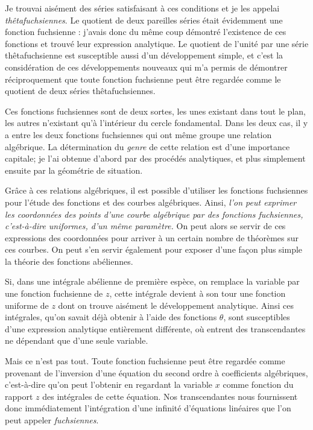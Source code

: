 \documentclass[11pt]{article}
\begin{document}
Je trouvai aisément des séries satisfaisant à ces conditions et je les appelai \emph{thêtafuchsiennes}. Le quotient de deux pareilles séries était évidemment une fonction fuchsienne : j’avais donc du même coup démontré l’existence de ces fonctions et trouvé leur expression analytique. Le quotient de l’unité par une série thêtafuchsienne est susceptible aussi d’un développement simple, et c’est la considération de ces développements nouveaux qui m’a permis de démontrer réciproquement que toute fonction fuchsienne peut être regardée comme le quotient de deux séries thêtafuchsiennes.

Ces fonctions fuchsiennes sont de deux sortes, les unes existant dans tout le plan, les autres n’existant qu’à l’intérieur du cercle fondamental. Dans les deux cas, il y a entre les deux fonctions fuchsiennes qui ont même groupe une relation algébrique. La détermination du \emph{genre} de cette relation est d’une importance capitale; je l’ai obtenue d’abord par des procédés analytiques, et plus simplement ensuite par la géométrie de situation.

Grâce à ces relations algébriques, il est possible d’utiliser les fonctions fuchsiennes pour l’étude des fonctions et des courbes algébriques. Ainsi, \emph{l’on peut exprimer les coordonnées des points d’une courbe algébrique par des fonctions fuchsiennes, c’est-à-dire uniformes, d’un même paramètre.} On peut alors se servir de ces expressions des coordonnées pour arriver à un certain nombre de théorèmes sur ces courbes. On peut s’en servir également pour exposer d’une façon plus simple la théorie des fonctions abéliennes.

Si, dans une intégrale abélienne de première espèce, on remplace la variable par une fonction fuchsienne de $z$, cette intégrale devient à son tour une fonction uniforme de $z$ dont on trouve aisément le développement analytique. Ainsi ces intégrales, qu’on savait déjà obtenir à l’aide des fonctions $\theta$, sont susceptibles d’une expression analytique entièrement différente, où entrent des transcendantes ne dépendant que d’une seule variable.

Mais ce n’est pas tout. Toute fonction fuchsienne peut être regardée comme provenant de l’inversion d’une équation du second ordre à coefficients algébriques, c’est-à-dire qu’on peut l’obtenir en regardant la variable $x$ comme fonction du rapport $z$ des intégrales de cette équation. Nos transcendantes nous fournissent donc immédiatement l’intégration d’une infinité d’équations linéaires que l’on peut appeler \emph{fuchsiennes}.
\end{document}
